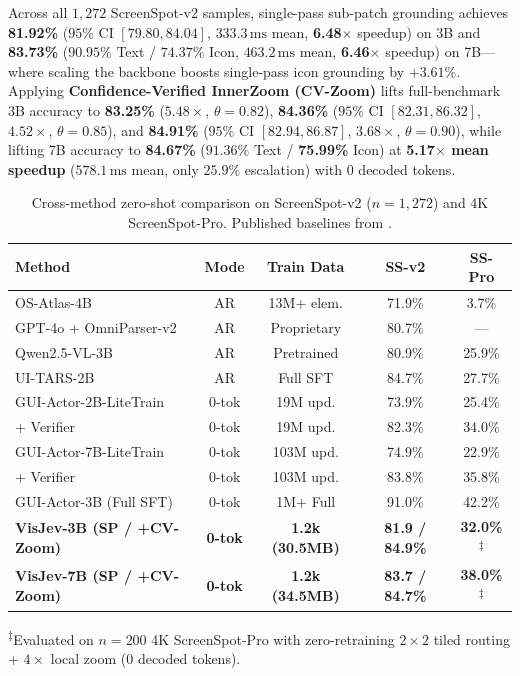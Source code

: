 \documentclass[10pt,twocolumn,letterpaper]{article}
\begin{document}
Across all $1{,}272$ ScreenSpot-v2 samples, single-pass sub-patch grounding achieves \textbf{81.92\%} ($95\%$ CI $[79.80, 84.04]$, $333.3\,\text{ms}$ mean, \textbf{6.48$\times$} speedup) on 3B and \textbf{83.73\%} ($90.95\%$ Text / $74.37\%$ Icon, $463.2\,\text{ms}$ mean, \textbf{6.46$\times$} speedup) on 7B---where scaling the backbone boosts single-pass icon grounding by $+3.61\%$. Applying \textbf{Confidence-Verified InnerZoom (CV-Zoom)} lifts full-benchmark 3B accuracy to \textbf{83.25\%} ($5.48\times$, $\theta{=}0.82$), \textbf{84.36\%} ($95\%$ CI $[82.31, 86.32]$, $4.52\times$, $\theta{=}0.85$), and \textbf{84.91\%} ($95\%$ CI $[82.94, 86.87]$, $3.68\times$, $\theta{=}0.90$), while lifting 7B accuracy to \textbf{84.67\%} ($91.36\%$ Text / \textbf{75.99\%} Icon) at \textbf{5.17$\times$ mean speedup} ($578.1\,\text{ms}$ mean, only $25.9\%$ escalation) with $0$ decoded tokens.

\begin{table}[t]
\centering
\caption{Cross-method zero-shot comparison on ScreenSpot-v2 ($n{=}1{,}272$) and 4K ScreenSpot-Pro. Published baselines from \cite{guiactor,qwen25vl,osatlas,uitars}.}
\label{tab:sota}
\scriptsize
\setlength{\tabcolsep}{2.2pt}
\begin{tabular}{@{}lcccc@{}}
\toprule
\textbf{Method} & \textbf{Mode} & \textbf{Train Data} & \textbf{SS-v2} & \textbf{SS-Pro} \\
\midrule
OS-Atlas-4B \cite{osatlas} & AR & 13M+ elem. & 71.9\% & 3.7\% \\
GPT-4o + OmniParser-v2 & AR & Proprietary & 80.7\% & --- \\
Qwen2.5-VL-3B \cite{qwen25vl} & AR & Pretrained & 80.9\% & 25.9\% \\
UI-TARS-2B \cite{uitars} & AR & Full SFT & 84.7\% & 27.7\% \\
\midrule
GUI-Actor-2B-LiteTrain \cite{guiactor} & 0-tok & 19M upd. & 73.9\% & 25.4\% \\
\quad + Verifier \cite{guiactor} & 0-tok & 19M upd. & 82.3\% & 34.0\% \\
GUI-Actor-7B-LiteTrain \cite{guiactor} & 0-tok & 103M upd. & 74.9\% & 22.9\% \\
\quad + Verifier \cite{guiactor} & 0-tok & 103M upd. & 83.8\% & 35.8\% \\
GUI-Actor-3B (Full SFT) \cite{guiactor} & 0-tok & 1M+ Full & 91.0\% & 42.2\% \\
\midrule
\rowcolor{rowhl}
\textbf{VisJev-3B (SP / +CV-Zoom)} & \textbf{0-tok} & \textbf{1.2k (30.5MB)} & \textbf{81.9 / 84.9\%} & \textbf{32.0\%}\textsuperscript{$\ddagger$} \\
\rowcolor{rowhl}
\textbf{VisJev-7B (SP / +CV-Zoom)} & \textbf{0-tok} & \textbf{1.2k (34.5MB)} & \textbf{83.7 / 84.7\%} & \textbf{38.0\%}\textsuperscript{$\ddagger$} \\
\bottomrule
\end{tabular}
\begin{flushleft}
\vspace{-4pt}
{\scriptsize \textsuperscript{$\ddagger$}Evaluated on $n{=}200$ 4K ScreenSpot-Pro with zero-retraining $2{\times}2$ tiled routing + $4{\times}$ local zoom ($0$ decoded tokens).}
\end{flushleft}
\end{table}
\end{document}
